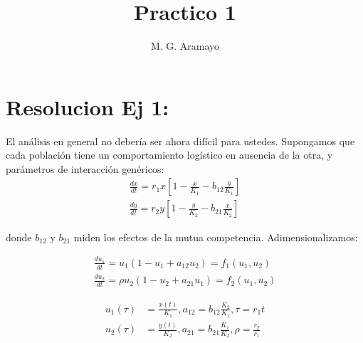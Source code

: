 \documentclass[twocolumn,aps,prl]{revtex4-1}
\begin{document}

\title{Practico 1}
\author{M. G. Aramayo}


\maketitle



\section{Resolucion Ej 1:}

El análisis en general no debería ser ahora difícil para ustedes. Supongamos que cada población tiene un comportamiento logístico en ausencia de la otra, y parámetros de interacción genéricos:
$$
\begin{aligned}
\frac{d x}{d t}=r_{1} x\left[1-\frac{x}{K_{1}}-b_{12} \frac{y}{K_{1}}\right] \\
\frac{d y}{d t}=r_{2} y\left[1-\frac{y}{K_{2}}-b_{21} \frac{x}{K_{2}}\right]
\end{aligned}
$$

donde $b_{12}$ y $b_{21}$ miden los efectos de la mutua competencia. Adimensionalizamos:

$$
\begin{aligned}
\frac{d u_{1}}{d t}=u_{1}\left(1-u_{1}+a_{12} u_{2}\right)=f_{1}\left(u_{1}, u_{2}\right) \\
\frac{d u_{2}}{d t}=\rho u_{2}\left(1-u_{2}+a_{21} u_{1}\right)=f_{2}\left(u_{1}, u_{2}\right)
\end{aligned}
$$

$$
\begin{aligned}
u_1(\tau) &= \frac{x(t)}{K_{1}}, a_{12} = b_{12} \frac{K_{2}}{K_{1}}, \tau=r_{1} t \\
u_2(\tau) &= \frac{y(t)}{K_{2}}, a_{21} = b_{21} \frac{K_{1}}{K_{2}}, \rho=\frac{r_{2}}{r_{1}}
\end{aligned}
$$
\end{document}
